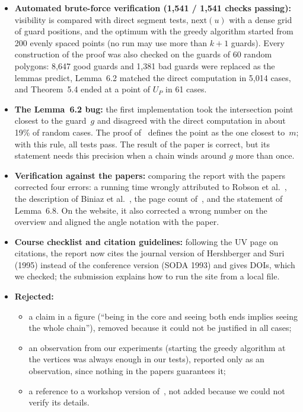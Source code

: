 \documentclass[11pt,a4paper]{article}
\begin{document}
\begin{itemize}[leftmargin=*]
\item \textbf{Automated brute-force verification (1,541 / 1,541 checks passing):} visibility is compared with direct segment tests, $\mathrm{next}(u)$ with a
dense grid of guard positions, and the optimum with the greedy algorithm started from 200 evenly spaced points (no run may use more than $k+1$ guards).
Every construction of the proof was also checked on the guards of 60 random polygons: 8,647 good guards and 1,381 bad guards were replaced as the lemmas
predict, Lemma~6.2 matched the direct computation in 5,014 cases, and Theorem~5.4 ended at a point of $U_P$ in 61 cases.
\item \textbf{The Lemma~6.2 bug:} the first implementation took the intersection point closest to the guard~$g$ and disagreed with the direct computation in
about 19\% of random cases. The proof of~\cite{deBerg2025} defines the point as the one closest to~$m$; with this rule, all tests pass. The result of the
paper is correct, but its statement needs this precision when a chain winds around $g$ more than once.
\item \textbf{Verification against the papers:} comparing the report with the papers corrected four errors: a running time wrongly attributed to Robson
et al.~\cite{Robson2024}, the description of Biniaz et al.~\cite{Biniaz2024}, the page count of~\cite{deBerg2025}, and the statement of Lemma~6.8. On the
website, it also corrected a wrong number on the overview and aligned the angle notation with the paper.
\item \textbf{Course checklist and citation guidelines:} following the UV page on citations, the report now cites the journal version of Hershberger and Suri
(1995) instead of the conference version (SODA 1993) and gives DOIs, which we checked; the submission explains how to run the site from a local file.
\item \textbf{Rejected:}
  \begin{itemize}[leftmargin=1.2em]
  \item a claim in a figure (``being in the core and seeing both ends implies seeing the whole chain''), removed because it could not be justified in all cases;
  \item an observation from our experiments (starting the greedy algorithm at the vertices was always enough in our tests), reported only as an observation,
  since nothing in the papers guarantees it;
  \item a reference to a workshop version of~\cite{deBerg2026}, not added because we could not verify its details.
  \end{itemize}
\end{itemize}
\end{document}

